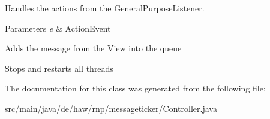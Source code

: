 Handles the actions from the General\-Purpose\-Listener. 


\begin{DoxyParams}{Parameters}
{\em e} & Action\-Event \\
\hline
\end{DoxyParams}
Adds the message from the View into the queue

Stops and restarts all threads

The documentation for this class was generated from the following file\-:\begin{DoxyCompactItemize}
\item 
src/main/java/de/haw/rnp/messageticker/Controller.\-java\end{DoxyCompactItemize}
